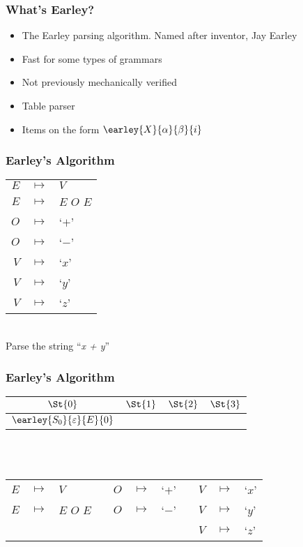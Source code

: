 \begin{frame}
	\frametitle{What's Earley?}

	\begin{itemize}
		\item The Earley parsing algorithm. Named after inventor, Jay Earley
		\item Fast for some types of grammars
		\item Not previously mechanically verified
		\item Table parser
		\item Items on the form $\earley{X}{\alpha}{\beta}{i}$
	\end{itemize}
\end{frame}

\begin{frame}
	\frametitle{Earley's Algorithm}
	\centering
	\begin{tabular}{rcl}
		$E$ & $ \mapsto $ & $V$ \\
		$E$ & $ \mapsto $ & $E$ $O$ $E$ \\
		$O$ & $ \mapsto $ & `$+$' \\
		$O$ & $ \mapsto $ & `$-$' \\
		$V$ & $ \mapsto $ & `$x$' \\
		$V$ & $ \mapsto $ & `$y$' \\
		$V$ & $ \mapsto $ & `$z$'
	\end{tabular} \\ \vspace{1cm}
	Parse the string ``\emph{x + y}''
\end{frame}

\begin{frame}
	\frametitle{Earley's Algorithm}
	\centering
	\begin{tabular}{|c|c|c|c|}
		\hline
		$\St{0}$ & $\St{1}$ & $\St{2}$ & $\St{3}$ \\
		\hline
		$\earley{S_0}{\varepsilon}{E}{0}$ & & & \\
		\hline
	\end{tabular}

	\\~\\
	\vspace{0.5cm}
	\scriptsize
	\begin{tabular}{rclcrclcrcl}
		$E$ & $ \mapsto $ & $V$         && $O$ & $ \mapsto $ & `$+$' && $V$ & $ \mapsto $ & `$x$' \\
		$E$ & $ \mapsto $ & $E$ $O$ $E$ && $O$ & $ \mapsto $ & `$-$' && $V$ & $ \mapsto $ & `$y$' \\
		    &             &             &&     &             &       && $V$ & $ \mapsto $ & `$z$'
	\end{tabular}
\end{frame}


